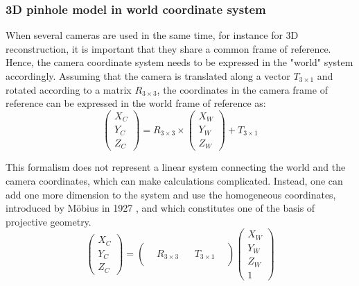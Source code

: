 \subsubsection{3D pinhole model in world coordinate system}

When several cameras are used in the same time, for instance for 3D reconstruction, it is important that they share a common frame of reference. Hence, the camera coordinate system needs to be expressed in the "world" system accordingly. Assuming that the camera is translated along a vector $T_{3\times 1}$ and rotated according to a matrix $R_{3\times 3}$, the coordinates in the camera frame of reference can be expressed in the world frame of reference as:
\begin{equation}
  \begin{pmatrix}X_C\\Y_C\\Z_C\end{pmatrix}
  = R_{3\times 3} \times \begin{pmatrix}X_W\\Y_W\\Z_W\end{pmatrix} + T_{3\times 1}
\end{equation}

\newpage
This formalism does not represent a linear system connecting the world and the camera coordinates, which can make calculations complicated. Instead, one can add one more dimension to the system and use the homogeneous coordinates, introduced by Möbius in 1927 \cite{Mobius1827}, and which constitutes one of the basis of projective geometry.
\begin{equation}\label{homogeneous}
  \begin{pmatrix}X_C\\Y_C\\Z_C\end{pmatrix}
  = \begin{pmatrix} &  & & \\ & R_{3\times 3} &  & T_{3\times 1} \\ &&&&\end{pmatrix} \begin{pmatrix}X_W\\Y_W\\Z_W\\1\end{pmatrix}
\end{equation}

